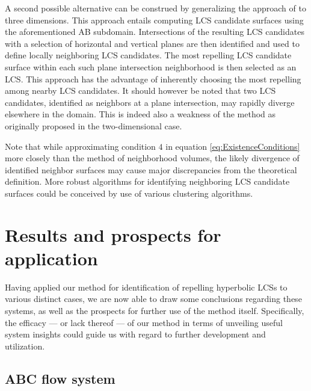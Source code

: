 A second possible alternative can be construed by generalizing the approach of \cite{Haller12} to three dimensions. This approach entails computing LCS candidate surfaces using the aforementioned AB subdomain. Intersections of the resulting LCS candidates with a selection of horizontal and vertical planes are then identified and used to define locally neighboring LCS candidates. The most repelling LCS candidate surface within each such plane intersection neighborhood is then selected as an LCS. This approach has the advantage of inherently choosing the most repelling among nearby LCS candidates. It should however be noted that two LCS candidates, identified as neighbors at a plane intersection, may rapidly diverge elsewhere in the domain. This is indeed also a weakness of the method as originally proposed in the two-dimensional case.

Note that while approximating condition $4$ in equation \eqref{eq:ExistenceConditions} more closely than the method of neighborhood volumes, the likely divergence of identified neighbor surfaces may cause major discrepancies from the theoretical definition. More robust algorithms for identifying neighboring LCS candidate surfaces could be conceived by use of various clustering algorithms. 

\section{Results and prospects for application}\label{sec:discussion_results}

Having applied our method for identification of repelling hyperbolic LCSs to various distinct cases, we are now able to draw some conclusions regarding these systems, as well as the prospects for further use of the method itself. Specifically, the efficacy --- or lack thereof --- of our method in terms of unveiling useful system insights could guide us with regard to further development and utilization.

\subsection{ABC flow system}\label{sec:discussion_ABC-flow}

